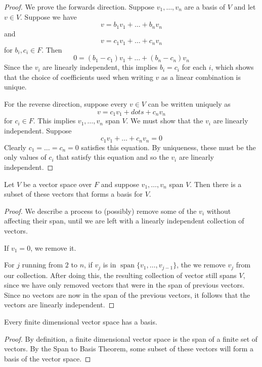\documentclass{article}
\DeclareMathOperator{\spn}{span}
\begin{document}
  \begin{proof}
    We prove the forwards direction. Suppose $v_1, \ldots, v_n$ are a basis of $V$ and let $v \in V$. Suppose we have
    \[
      v = b_1v_1 + \dots + b_nv_n
    \] and \[
      v = c_1v_1 + \dots + c_nv_n
    \]
    for $b_i, c_i \in F$.
    Then
    \[
      0 = (b_1 - c_1)v_1 + \dots + (b_n - c_n) v_n
    \]
    Since the $v_i$ are linearly independent, this implies $b_i = c_i$ for each $i$, which shows that the choice of coefficients used when writing $v$ as a linear combination is unique.

    For the reverse direction, suppose every $v \in V$ can be written uniquely as \[
      v = c_1v_1 + dots + c_nv_n
    \]
    for $c_i \in F$. This implies $v_1, \ldots, v_n$ span $V$. We must show that the $v_i$ are linearly independent. Suppose \[
      c_1v_1 + \dots + c_nv_n = 0
    \]
    Clearly $c_1 = \dots = c_n = 0$ satisfies this equation. By uniqueness, these must be the only values of $c_i$ that satisfy this equation and so the $v_i$ are linearly independent.
  \end{proof}
  \begin{cthm}
    Let $V$ be a vector space over $F$ and suppose $v_1, \ldots, v_n$ span $V$. Then there is a subset of these vectors that forms a basis for $V$.
  \end{cthm}
  \begin{proof}
    We describe a process to (possibly) remove some of the $v_i$ without affecting their span, until we are left with a linearly independent collection of vectors.

    If $v_1 = 0$, we remove it.

    For $j$ running from $2$ to $n$, if $v_j$ is in $\spn \{v_1, \ldots, v_{j-1}\}$, the we remove $v_j$ from our collection. After doing this, the resulting collection of vector still spans $V$, since we have only removed vectors that were in the span of previous vectors. Since no vectors are now in the span of the previous vectors, it follows that the vectors are linearly independent.
  \end{proof}
  \begin{corollary}
    Every finite dimensional vector space has a basis.
  \end{corollary}
  \begin{proof}
    By definition, a finite dimensional vector space is the span of a finite set of vectors. By the Span to Basis Theorem, some subset of these vectors will form a basis of the vector space.
  \end{proof}
\end{document}

